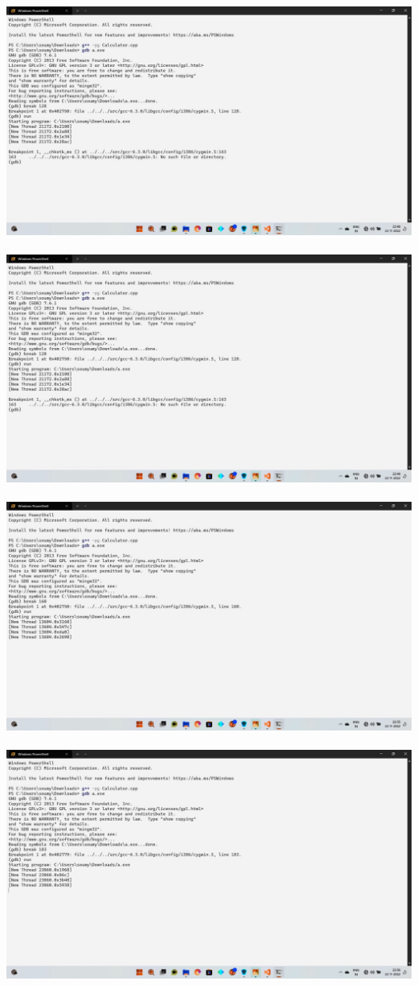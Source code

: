 \documentclass[11pt]{article}
\begin{document}
\includegraphics[scale=0.4]{debug1.png}\\ \\
\includegraphics[scale=0.4]{debug2.png}\\ \\
\includegraphics[scale=0.4]{debug3.png}\\ \\
\pagebreak
\includegraphics[scale=0.4]{debug4.png}\\ \\
\end{document}

